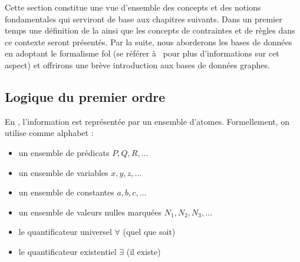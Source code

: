 Cette section constitue une vue d'ensemble des concepts et des notions fondamentales qui serviront de base aux chapitres suivants.
Dans un premier temps une définition de la  ainsi que les concepts de contraintes et de règles dans ce contexte seront présentés.
Par la suite, nous aborderons les bases de données en adoptant le formalisme \gls{fol} (se référer à~\cite{abiteboulFoundationsDatabases1995} pour plus d'informations sur cet aspect) et offrirons une brève introduction aux bases de données graphes.

\subsection{Logique du premier ordre}
\label{sec:update:pre:logic}


En , l'information est représentée par un ensemble d'atomes.
Formellement, on utilise comme alphabet :
\begin{itemize}
    \item un ensemble de prédicats $P, Q, R, \dots$
    \item un ensemble de variables $x, y, z, \dots$
    \item un ensemble de constantes $a, b, c, \dots$
    \item un ensemble de valeurs nulles marquées $N_1, N_2, N_3, \dots$
    \item le quantificateur universel $\forall$ (quel que soit)
    \item le quantificateur existentiel $\exists$ (il existe)
\end{itemize}

